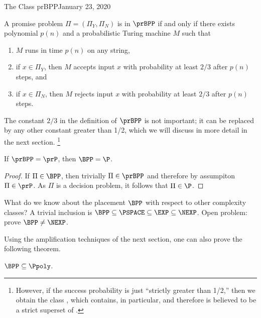 \begin{lecture}{1}{The Class prBPP}{January 23, 2020}
\begin{definition}[$\prBPP$]
  A promise problem $\Pi = (\Pi_Y, \Pi_N)$ is in $\prBPP$ if and only if there
  exists polynomial $p(n)$ and a probabilistic Turing machine $M$ such that
  \begin{enumerate}
    \item $M$ runs in time $p(n)$ on any string,
    \item if $x \in \Pi_Y$, then $M$ accepts input $x$ with probability at
      least $2/3$ after $p(n)$ steps, and
    \item if $x \in \Pi_N$, then $M$ rejects input $x$ with probability at
      least $2/3$ after $p(n)$ steps.
  \end{enumerate}
\end{definition}

The constant $2/3$ in the definition of $\prBPP$ is not important; it
can be replaced by any other constant greater than 1/2, which we will discuss
in more detail in the next section.%
\footnote{However, if the success probability is just ``strictly greater than
  1/2,'' then we obtain the class \PP, which contains, in particular, \NP{} and
  therefore is believed to be a strict superset of \BPP.}

\begin{proposition}
  If $\prBPP = \prP$, then $\BPP = \P$.
\end{proposition}

\begin{proof}
  If $\Pi \in \BPP$, then trivially $\Pi \in \prBPP$ and therefore by
  assumpiton $\Pi \in \prP$. As $\Pi$ is a decision problem, it follows
  that $\Pi \in \P$.
\end{proof}

What do we know about the placement $\BPP$ with respect to other complexity
classes? A trivial inclusion is $\BPP \subseteq \PSPACE \subseteq \EXP
\subseteq \NEXP$. Open problem: prove $\BPP \ne \NEXP$.

Using the amplification techniques of the next section, one can also prove
the following theorem.

\begin{theorem}
  $\BPP \subseteq \Ppoly$.
\end{theorem}



\end{lecture}
